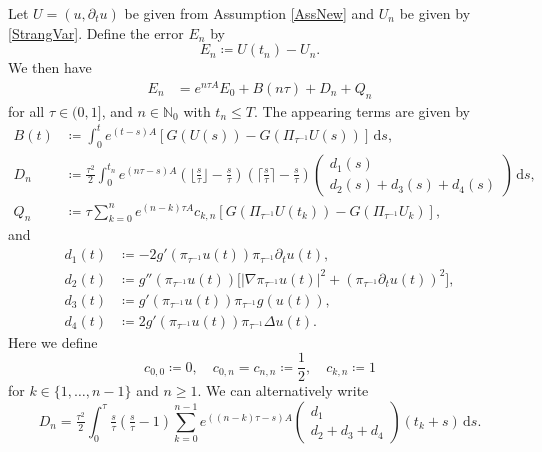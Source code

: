 \documentclass[10pt,a4paper]{amsart}
\newcommand{\N}{\mathbb{N}} %
\newcommand{\dd}{\, \mathrm{d}}
\begin{document}
\begin{Proposition}\label{PropFehlerRekStrangNew}
Let $U=(u,\partial_tu)$ be given from Assumption \ref{AssNew} and $U_n$ be given by \eqref{StrangVar}. Define the error $E_n$ by \begin{equation}\label{DefErrorStrang}
	E_n \coloneqq U(t_n) - U_n.
\end{equation}
We then have
\begin{align}\label{FehlerRekStrangNew}
	E_{n} &= e^{n\tau A}E_0 +  B(n\tau) +  D_n + Q_n
\end{align}
for all $\tau \in (0,1]$, and $n \in \N_0$ with $t_{n} \le T$. The appearing terms are given by 
\begin{align}\label{DefTermeStrangNew}
	B(t) &\coloneqq \int_0^{t} e^{(t-s)A}[G(U(s))-G(\Pi_{\tau^{-1}} U(s))] \dd s,\nonumber\\
	D_n &\coloneqq \tfrac{\tau^2}{2}\int_0^{t_n} e^{(n\tau-s)A}(\lfloor\tfrac s\tau\rfloor-\tfrac s\tau)(\lceil\tfrac s\tau\rceil-\tfrac s\tau)\begin{pmatrix}d_1(s) \\ d_2(s)+d_3(s)+d_4(s)\end{pmatrix} \dd s,\\
	Q_n &\coloneqq \tau\sum_{k=0}^{n} e^{(n-k)\tau A} {c_{k,n}}[G(\Pi_{\tau^{-1}} U(t_k))-G(\Pi_{\tau^{-1}}U_k)] , \nonumber
\end{align}
and
\begin{equation}\label{DefdStrangNew}
\begin{aligned}
	d_1(t) &\coloneqq -2g'(\pi_{\tau^{-1}}u(t))\pi_{\tau^{-1}}\partial_tu(t), \\ 
	d_2(t) &\coloneqq g''(\pi_{\tau^{-1}}u(t))\big[|\nabla \pi_{\tau^{-1}}u(t)|^2 + (\pi_{\tau^{-1}}\partial_tu(t))^2\big], \\
	d_3(t) &\coloneqq g'(\pi_{\tau^{-1}}u(t))\pi_{\tau^{-1}}g(u(t)), \\
	d_4(t) &\coloneqq 2g'(\pi_{\tau^{-1}}u(t))\pi_{\tau^{-1}}\Delta u(t).
\end{aligned}
\end{equation}
{Here we define 
	\begin{equation*}\label{Defcnk}
		c_{0,0} \coloneqq 0, \quad c_{0,n}= c_{n,n} \coloneqq \frac12,\quad c_{k,n} \coloneqq 1
	\end{equation*}
	for $k \in \{1,\dots,n-1\}$ and $n \ge 1$.}
We can alternatively write
\begin{equation}\label{eq:StrangDAlt}
	D_n = \tfrac{\tau^2}{2} \int_0^\tau \tfrac s \tau (\tfrac s \tau -1) \sum_{k=0}^{n-1} e^{((n-k)\tau-s) A} \begin{pmatrix}d_1 \\ d_2+d_3+d_4\end{pmatrix}(t_k+s) \dd s.
\end{equation}
\end{Proposition}
\end{document}
